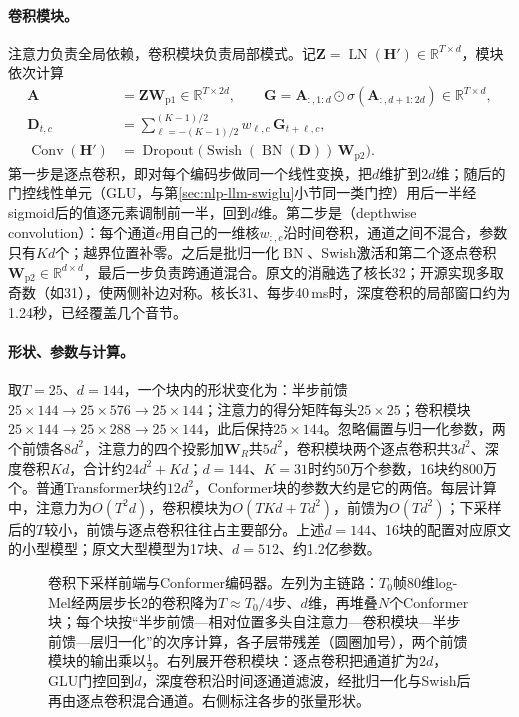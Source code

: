 \paragraph{卷积模块。}注意力负责全局依赖，卷积模块负责局部模式。记$\bm Z=\operatorname{LN}(\bm H')\in\mathbb R^{T\times d}$，模块依次计算
\begin{equation}
 \begin{aligned}
  \bm A&=\bm Z\bm W_{\mathrm{p1}}\in\mathbb R^{T\times2d},\qquad
  \bm G=\bm A_{:,1:d}\odot\sigma(\bm A_{:,d+1:2d})\in\mathbb R^{T\times d},\\
  \bm D_{t,c}&=\sum_{\ell=-(K-1)/2}^{(K-1)/2}w_{\ell,c}\,\bm G_{t+\ell,c},\\
  \operatorname{Conv}(\bm H')&=\operatorname{Dropout}\bigl(\operatorname{Swish}(\operatorname{BN}(\bm D))\,\bm W_{\mathrm{p2}}\bigr).
 \end{aligned}
 \label{eq:nlp-speech-conv-module}
\end{equation}
第一步是逐点卷积，即对每个编码步做同一个线性变换，把$d$维扩到$2d$维；随后的门控线性单元（GLU，与第\ref{sec:nlp-llm-swiglu}小节同一类门控）用后一半经sigmoid后的值逐元素调制前一半，回到$d$维。第二步是（depthwise convolution）：每个通道$c$用自己的一维核$w_{:,c}$沿时间卷积，通道之间不混合，参数只有$Kd$个；越界位置补零。之后是批归一化$\operatorname{BN}$、Swish激活和第二个逐点卷积$\bm W_{\mathrm{p2}}\in\mathbb R^{d\times d}$，最后一步负责跨通道混合。原文的消融选了核长32；开源实现多取奇数（如31），使两侧补边对称。核长31、每步40\,ms时，深度卷积的局部窗口约为1.24秒，已经覆盖几个音节。

\paragraph{形状、参数与计算。}取$T=25$、$d=144$，一个块内的形状变化为：半步前馈$25\times144\to25\times576\to25\times144$；注意力的得分矩阵每头$25\times25$；卷积模块$25\times144\to25\times288\to25\times144$，此后保持$25\times144$。忽略偏置与归一化参数，两个前馈各$8d^2$，注意力的四个投影加$\bm W_R$共$5d^2$，卷积模块两个逐点卷积共$3d^2$、深度卷积$Kd$，合计约$24d^2+Kd$；$d=144$、$K=31$时约50万个参数，16块约800万个。普通Transformer块约$12d^2$，Conformer块的参数大约是它的两倍。每层计算中，注意力为$O(T^2d)$，卷积模块为$O(TKd+Td^2)$，前馈为$O(Td^2)$；下采样后的$T$较小，前馈与逐点卷积往往占主要部分。上述$d=144$、16块的配置对应原文的小型模型；原文大型模型为17块、$d=512$、约1.2亿参数。

\begin{figure}[htbp]
  \centering
  
  \caption{卷积下采样前端与Conformer编码器。左列为主链路：$T_0$帧80维log-Mel经两层步长2的卷积降为$T\approx T_0/4$步、$d$维，再堆叠$N$个Conformer块；每个块按“半步前馈—相对位置多头自注意力—卷积模块—半步前馈—层归一化”的次序计算，各子层带残差（圆圈加号），两个前馈模块的输出乘以$\frac12$。右列展开卷积模块：逐点卷积把通道扩为$2d$，GLU门控回到$d$，深度卷积沿时间逐通道滤波，经批归一化与Swish后再由逐点卷积混合通道。右侧标注各步的张量形状。}
  \label{fig:nlp-speech-conformer}
\end{figure}

